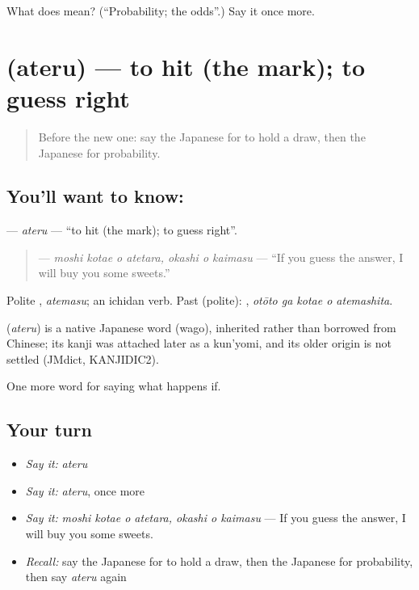 \begin{tcolorbox}[breakable,colback=teal!4,colframe=teal!35!black,title={Before you move on}]
What does  mean? (\textquotedblleft{}Probability; the odds\textquotedblright{}.) Say it once more.
\end{tcolorbox}
\section[\texorpdfstring{\ja{あてる} (ateru)}{あてる (ateru)}]{ (ateru) — to hit (the mark); to guess right}

\label{lesson:JA-C509-ateru}



\begin{quote}
Before the new one: say the Japanese for to hold a draw, then the Japanese for probability.
\end{quote}

\subsection*{You'll want to know: }
\textbf{} — \emph{ateru} — \textquotedblleft{}to hit (the mark); to guess right\textquotedblright{}.

\begin{quote}
\textbf{   } — \emph{moshi kotae o atetara, okashi o kaimasu} — \textquotedblleft{}If you guess the answer, I will buy you some sweets.\textquotedblright{}
\end{quote}

Polite \textbf{}, \emph{atemasu}; an ichidan verb. Past (polite): \textbf{  }, \emph{otōto ga kotae o atemashita}.

\begin{cousinweb}
\textbf{} (\emph{ateru}) is a native Japanese word (wago), inherited rather than borrowed from Chinese; its kanji was attached later as a kun'yomi, and its older origin is not settled (JMdict, KANJIDIC2).
\end{cousinweb}

\begin{grammarlens}[title={What you've built}]
One more word for saying what happens if.
\end{grammarlens}

\subsection*{Your turn}
\begin{itemize}
\raggedright
  \item \emph{Say it:} \emph{ateru}
  \item \emph{Say it:} \emph{ateru}, once more
  \item \emph{Say it:} \emph{moshi kotae o atetara, okashi o kaimasu} — If you guess the answer, I will buy you some sweets.
  \item \emph{Recall:} say the Japanese for to hold a draw, then the Japanese for probability, then say \emph{ateru} again
\end{itemize}

